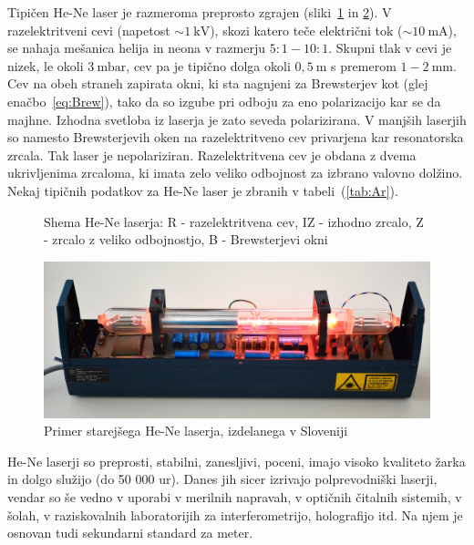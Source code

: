 Tipičen He-Ne laser je razmeroma preprosto zgrajen (sliki~\ref{fig:HeNeShema}
in \ref{fig:Iskra}).
V razelektritveni cevi (napetost  $\sim 1~\si{\kilo\volt}$), skozi
katero teče električni tok ($\sim 10~\si{\milli\ampere}$), 
se nahaja mešanica helija in neona v razmerju 
$5:1 - 10:1$. Skupni tlak v cevi je nizek, le okoli $3~\si{\milli\bar}$, 
cev pa je tipično dolga okoli $0,5~\si{\metre}$ s premerom $1-2~\si{\milli\metre}$.  
Cev na obeh straneh zapirata okni, ki sta nagnjeni za Brewsterjev kot (glej enačbo~\ref{eq:Brew}), 
tako da so izgube pri odboju za eno polarizacijo kar se da majhne.
Izhodna svetloba iz laserja je zato seveda polarizirana. V manjših laserjih
so namesto Brewsterjevih oken na razelektritveno cev privarjena kar
resonatorska zrcala. Tak laser je nepolariziran. 
Razelektritvena cev je obdana z dvema ukrivljenima zrcaloma, 
ki imata zelo veliko odbojnost za izbrano valovno dolžino.
Nekaj tipičnih podatkov za He-Ne laser je zbranih v tabeli~(\ref{tab:Ar}).
\begin{figure}[h]
\centering
\def\svgwidth{100truemm} 

\caption{Shema He-Ne laserja: R - razelektritvena cev, IZ - izhodno zrcalo, Z - zrcalo
z veliko odbojnostjo, B - Brewsterjevi okni}
\label{fig:HeNeShema}
\end{figure}

\begin{figure}[h]
\centering
\includegraphics[width=120truemm]{slike/07_HeNe.jpg}
\caption{Primer starejšega He-Ne laserja, izdelanega v Sloveniji}
\label{fig:Iskra}
\end{figure}

He-Ne laserji so preprosti, stabilni, zanesljivi, poceni, imajo visoko kvaliteto žarka
in dolgo služijo (do 50 000 ur).
Danes jih sicer izrivajo polprevodniški laserji, vendar so še vedno v uporabi
v merilnih napravah, v optičnih čitalnih sistemih, v šolah, v raziskovalnih 
laboratorijih za interferometrijo, holografijo itd. Na njem je osnovan tudi 
sekundarni standard za meter.


